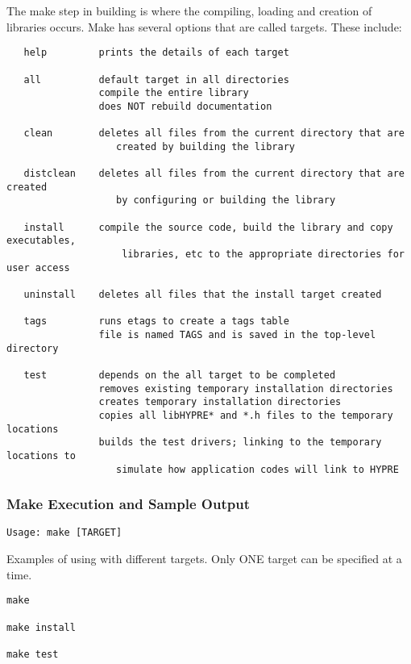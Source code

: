 The make step in building \hypre{} is where the compiling, loading and creation 
of libraries occurs.  Make has several options that are called targets.  These include:
\begin{verbatim}
   help         prints the details of each target

   all          default target in all directories
                compile the entire library
                does NOT rebuild documentation

   clean        deletes all files from the current directory that are 
                   created by building the library

   distclean    deletes all files from the current directory that are created
                   by configuring or building the library

   install      compile the source code, build the library and copy executables,
                    libraries, etc to the appropriate directories for user access

   uninstall    deletes all files that the install target created

   tags         runs etags to create a tags table
                file is named TAGS and is saved in the top-level directory

   test         depends on the all target to be completed
                removes existing temporary installation directories
                creates temporary installation directories
                copies all libHYPRE* and *.h files to the temporary locations
                builds the test drivers; linking to the temporary locations to
                   simulate how application codes will link to HYPRE
\end{verbatim}


\subsubsection{Make Execution and Sample Output}
\label{Make Execution and Sample Output}

\begin{verbatim}
Usage: make [TARGET]
\end{verbatim}

Examples of using  with different targets.  Only ONE target can be specified at a time. 
\begin{verbatim}
make

make install

make test
\end{verbatim}

